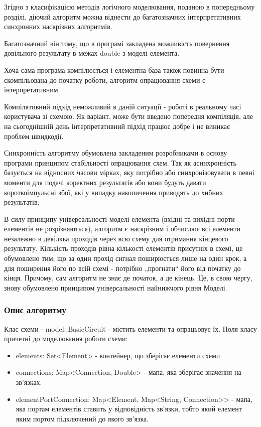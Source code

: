 \documentclass[12pt,a4paper]{article}
\begin{document}
Згідно з класифікацією методів логічного моделювання, поданою в попередньому розділі, діючий алгоритм можна віднести до багатозначних інтерпретативних синхронних наскрізних алгоритмів.

Багатозначний він тому, що в програмі закладена можливість повернення довільного результату в межах double з моделі елемента.

Хоча сама програма компілюється і елементна база також повинна бути скомпільована до початку роботи, алгоритм опрацювання схеми є інтерпретативним.

Компілятивний підхід неможливий в даній ситуації - роботі в реальному часі користувача зі схемою. Як варіант, може бути введено попередня компіляція, але на сьогоднішній день інтерпретативний підхід працює добре і не виникає проблем швидкодії.

Синхронність алгоритму обумовлена закладеним розробниками в основу програми принципом стабільності опрацювання схем. Так як асинхронність базується на відносних часови мірках, яку потрібно або синхронізовувати в певні моменти для подачі коректних результатів або вони будуть давати короткоімпульсні збої, які у випадку накопичення приводять до хибних результатів.

В силу принципу універсальності моделі елемента (вхідні та вихідні порти елементів не розрізняються), алгоритм є наскрізним і обчислює всі елементи незалежно в декілкьа проходів через всю схему для отримання кінцевого результату. Кількість проходів рівна кількості елементів присутніх в схемі, це обумовлено тим, що за один прохід сигнал поширюється лише на один крок, а для поширення його по всій схемі - потрібно „прогнати“ його від початку до кінця. Причому, сам алгоритм не знає де початок, а де кінець. Це, в свою чергу, знову обумовлено принципом універсальності найнижчого рівня Моделі.

\subsubsection{Опис алгоритму}

Клас схеми - model::BasicCircuit - містить елементи та опрацьовує їх.
Поля класу причетні до моделювання роботи схеми:
\begin{itemize}
  \item elements: Set<Element> - контейнер, що зберігає елементи схеми
  \item connections: Map<Connection, Double> - мапа, яка зберігає значення на зв’язках.
  \item elementPortConnection: Map<Element, Map<String, Connection>> - мапа, яка портам елементів ставить у відповідність зв’язки, тобто який елемент яким портом підключений до якого зв’язка.
\end{itemize}
\end{document}
